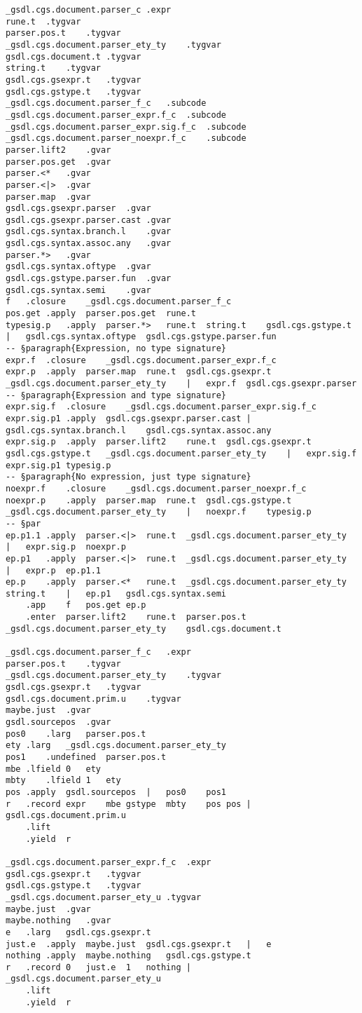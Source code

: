 \documentclass{report}
\begin{document}
\begin{verbatim}
_gsdl.cgs.document.parser_c	.expr
rune.t	.tygvar
parser.pos.t	.tygvar
_gsdl.cgs.document.parser_ety_ty	.tygvar
gsdl.cgs.document.t	.tygvar
string.t	.tygvar
gsdl.cgs.gsexpr.t	.tygvar
gsdl.cgs.gstype.t	.tygvar
_gsdl.cgs.document.parser_f_c	.subcode
_gsdl.cgs.document.parser_expr.f_c	.subcode
_gsdl.cgs.document.parser_expr.sig.f_c	.subcode
_gsdl.cgs.document.parser_noexpr.f_c	.subcode
parser.lift2	.gvar
parser.pos.get	.gvar
parser.<*	.gvar
parser.<|>	.gvar
parser.map	.gvar
gsdl.cgs.gsexpr.parser	.gvar
gsdl.cgs.gsexpr.parser.cast	.gvar
gsdl.cgs.syntax.branch.l	.gvar
gsdl.cgs.syntax.assoc.any	.gvar
parser.*>	.gvar
gsdl.cgs.syntax.oftype	.gvar
gsdl.cgs.gstype.parser.fun	.gvar
gsdl.cgs.syntax.semi	.gvar
f	.closure	_gsdl.cgs.document.parser_f_c
pos.get	.apply	parser.pos.get	rune.t
typesig.p	.apply	parser.*>	rune.t	string.t	gsdl.cgs.gstype.t	|	gsdl.cgs.syntax.oftype	gsdl.cgs.gstype.parser.fun
-- §paragraph{Expression, no type signature}
expr.f	.closure	_gsdl.cgs.document.parser_expr.f_c
expr.p	.apply	parser.map	rune.t	gsdl.cgs.gsexpr.t	_gsdl.cgs.document.parser_ety_ty	|	expr.f	gsdl.cgs.gsexpr.parser
-- §paragraph{Expression and type signature}
expr.sig.f	.closure	_gsdl.cgs.document.parser_expr.sig.f_c
expr.sig.p1	.apply	gsdl.cgs.gsexpr.parser.cast	|	gsdl.cgs.syntax.branch.l	gsdl.cgs.syntax.assoc.any
expr.sig.p	.apply	parser.lift2	rune.t	gsdl.cgs.gsexpr.t	gsdl.cgs.gstype.t	_gsdl.cgs.document.parser_ety_ty	|	expr.sig.f	expr.sig.p1	typesig.p
-- §paragraph{No expression, just type signature}
noexpr.f	.closure	_gsdl.cgs.document.parser_noexpr.f_c
noexpr.p	.apply	parser.map	rune.t	gsdl.cgs.gstype.t	_gsdl.cgs.document.parser_ety_ty	|	noexpr.f	typesig.p
-- §par
ep.p1.1	.apply	parser.<|>	rune.t	_gsdl.cgs.document.parser_ety_ty	|	expr.sig.p	noexpr.p
ep.p1	.apply	parser.<|>	rune.t	_gsdl.cgs.document.parser_ety_ty	|	expr.p	ep.p1.1
ep.p	.apply	parser.<*	rune.t	_gsdl.cgs.document.parser_ety_ty	string.t	|	ep.p1	gsdl.cgs.syntax.semi
	.app	f	pos.get	ep.p
	.enter	parser.lift2	rune.t	parser.pos.t	_gsdl.cgs.document.parser_ety_ty	gsdl.cgs.document.t

_gsdl.cgs.document.parser_f_c	.expr
parser.pos.t	.tygvar
_gsdl.cgs.document.parser_ety_ty	.tygvar
gsdl.cgs.gsexpr.t	.tygvar
gsdl.cgs.document.prim.u	.tygvar
maybe.just	.gvar
gsdl.sourcepos	.gvar
pos0	.larg	parser.pos.t
ety	.larg	_gsdl.cgs.document.parser_ety_ty
pos1	.undefined	parser.pos.t
mbe	.lfield	0	ety
mbty	.lfield	1	ety
pos	.apply	gsdl.sourcepos	|	pos0	pos1
r	.record	expr	mbe	gstype	mbty	pos	pos	|	gsdl.cgs.document.prim.u
	.lift
	.yield	r

_gsdl.cgs.document.parser_expr.f_c	.expr
gsdl.cgs.gsexpr.t	.tygvar
gsdl.cgs.gstype.t	.tygvar
_gsdl.cgs.document.parser_ety_u	.tygvar
maybe.just	.gvar
maybe.nothing	.gvar
e	.larg	gsdl.cgs.gsexpr.t
just.e	.apply	maybe.just	gsdl.cgs.gsexpr.t	|	e
nothing	.apply	maybe.nothing	gsdl.cgs.gstype.t
r	.record	0	just.e	1	nothing	|	_gsdl.cgs.document.parser_ety_u
	.lift
	.yield	r


\end{verbatim}
\end{document}
